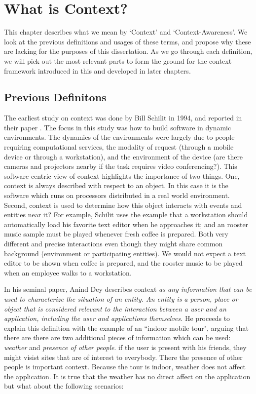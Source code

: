 \chapter{What is Context?}

This chapter describes what we mean by `Context' and `Context-Awareness'. We look at the previous definitions and usages of these terms, and propose why these are lacking for the purposes of this dissertation. As we go through each definition, we will pick out the most relevant parts to form the ground for the context framework introduced in this and developed in later chapters.

\section{Previous Definitons}

The earliest study on context was done by Bill Schilit in 1994, and reported in their paper \cite{schilit1994context}. The focus in this study was how to build software in dynamic environments. The dynamics of the environments were largely due to people requiring computational services, the modality of request (through a mobile device or through a workstation), and the environment of the device (are there cameras and projectors nearby if the task requires video conferencing?). This software-centric view of context highlights the importance of two things. One, context is always described with respect to an object. In this case it is the software which runs on processors distributed in a real world environment. Second, context is used to determine how this object interacts with events and entities near it? For example, Schilit uses the example that a workstation should automatically load his favorite text editor when he approaches it; and an rooster music sample must be played whenever fresh coffee is prepared. Both very different and precise interactions even though they might share common background (environment or participating entities). We would not expect a text editor to be shown when coffee is prepared, and the rooster music to be played when an employee walks to a workstation.

In his seminal paper, Anind Dey \cite{dey2001understanding} describes context \textit{as any information that can be used to characterize the situation of an entity. An entity is a person, place or object that is considered relevant to the interaction between a user and an application, including the user and applications themselves.} He proceeds to explain this definition with the example of an ``indoor mobile tour", arguing that there are there are two additional pieces of information which can be used: \textit{weather} and \textit{presence of other people}. if the user is present with his friends, they might visist sites that are of interest to everybody. There the presence of other people is important context. Because the tour is indoor, weather does not affect the application. It is true that the weather has no direct affect on the application but what about the following scenarios:

